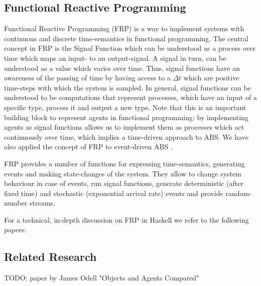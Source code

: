 \subsection{Functional Reactive Programming}
Functional Reactive Programming (FRP) is a way to implement systems with continuous and discrete time-semantics in functional programming. The central concept in FRP is the Signal Function which can be understood as a process over time which maps an input- to an output-signal. A signal in turn, can be understood as a value
which varies over time. Thus, signal functions have an awareness of the passing of time by having access to a $\Delta t$ which are positive time-steps with which the system is sampled. In general, signal functions can be understood to be computations that represent processes, which have an input of a specific type, process it and output a new type. Note that this is an important building block to represent agents in functional programming: by implementing agents as signal functions allows us to implement them as processes which act continuously over time, which implies a time-driven approach to ABS. We have also applied the concept of FRP to event-driven ABS \citep{meyer_event-driven_2014}.

FRP provides a number of functions for expressing time-semantics, generating events and making state-changes of the system. They allow to change system behaviour in case of events, run signal functions, generate deterministic (after fixed time) and stochastic (exponential arrival rate) events and provide random-number streams. 

For a technical, in-depth discussion on FRP in Haskell we refer to the following papers: \citep{wan_functional_2000, hughes_generalising_2000, hughes_programming_2005, nilsson_functional_2002, hudak_arrows_2003, courtney_yampa_2003, perez_functional_2016, perez_extensible_2017}

\subsection{Related Research}
TODO: paper by James Odell "Objects and Agents Compared"
